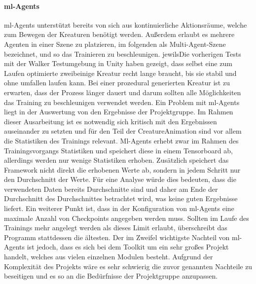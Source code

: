 \paragraph{ml-Agents}\fup
ml-Agents unterstützt bereits von sich aus kontinuierliche Aktionsräume, welche zum Bewegen der Kreaturen benötigt werden. Außerdem erlaubt es mehrere Agenten in einer Szene zu platzieren, im folgenden als Multi-Agent-Szene bezeichnet, und so das Trainieren zu beschleunigen. jewilsDie vorherigen Tests mit der Walker Testumgebung in Unity \cite{walkerEnv} haben gezeigt, dass selbst eine zum Laufen optimierte zweibeinige Kreatur recht lange braucht, bis sie stabil und ohne umfallen laufen kann.
Bei einer prozedural generierten Kreatur ist zu erwarten, dass der Prozess länger dauert und darum sollten alle Möglichkeiten das Training zu beschleunigen verwendet werden.
Ein Problem mit ml-Agents liegt in der Auswertung von den Ergebnisse der Projektgruppe. Im Rahmen dieser Ausarbeitung ist es notwendig sich kritisch mit den Ergebnissen auseinander zu setzten und für den Teil der CreatureAnimation sind vor allem die Statistiken des Trainings relevant. Ml-Agents erhebt zwar im Rahmen des Trainingsvorgangs Statistiken und speichert diese in einem Tensorboard ab, allerdings werden nur wenige Statistiken erhoben. Zusätzlich speichert das Framework nicht direkt die erhobenen Werte ab, sondern in jedem Schritt nur den Durchschnitt der Werte. Für eine Analyse würde dies bedeuten, dass die verwendeten Daten bereits Durchschnitte sind und daher am Ende der Durchschnitt des Durchschnittes betrachtet wird, was keine guten Ergebnisse liefert. 
Ein weiterer Punkt ist, dass in der Konfiguration von ml-Agents eine maximale Anzahl von Checkpoints angegeben werden muss. Sollten im Laufe des Trainings mehr angelegt werden als dieses Limit erlaubt, überschreibt das Programm stattdessen die ältesten.
Der im Zweifel wichtigste Nachteil von ml-Agents ist jedoch, dass es sich bei dem Toolkit um ein sehr großes Projekt handelt, welches aus vielen einzelnen Modulen besteht. Aufgrund der Komplexität des Projekts wäre es sehr schwierig die zuvor genannten Nachteile zu beseitigen und es so an die Bedürfnisse der Projektgruppe anzupassen.\\
